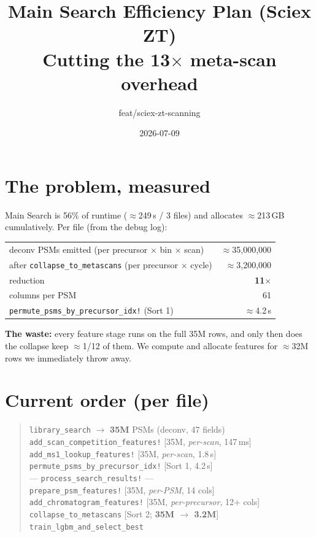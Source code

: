 \documentclass[11pt]{article}
\title{\textbf{Main Search Efficiency Plan (Sciex ZT)}\\[4pt]
\large Cutting the 13$\times$ meta-scan overhead}
\author{feat/sciex-zt-scanning}
\date{2026-07-09}
\newcommand{\code}[1]{\texttt{\small #1}}
\begin{document}
\maketitle

\section{The problem, measured}

Main Search is 56\% of runtime ($\approx$249\,s / 3 files) and allocates
$\approx$213\,GB cumulatively. Per file (from the debug log):

\begin{center}
\begin{tabular}{lr}
\toprule
deconv PSMs emitted (per precursor $\times$ bin $\times$ scan) & $\approx$35{,}000{,}000 \\
after \code{collapse\_to\_metascans} (per precursor $\times$ cycle) & $\approx$3{,}200{,}000 \\
reduction & \textbf{11$\times$} \\
columns per PSM & 61 \\
\code{permute\_psms\_by\_precursor\_idx!} (Sort 1) & $\approx$4.2\,s \\
\bottomrule
\end{tabular}
\end{center}

\textbf{The waste:} every feature stage runs on the full 35M rows, and only then
does the collapse keep $\approx$1/12 of them. We compute and allocate features for
$\approx$32M rows we immediately throw away.

\section{Current order (per file)}

\begin{quote}
\code{library\_search} $\to$ \textbf{35M} PSMs (deconv, 47 fields)\\
\code{add\_scan\_competition\_features!} \hfill [35M, \emph{per-scan}, 147\,ms]\\
\code{add\_ms1\_lookup\_features!} \hfill [35M, \emph{per-scan}, 1.8\,s]\\
\code{permute\_psms\_by\_precursor\_idx!} \hfill [Sort 1, 4.2\,s]\\
--- \code{process\_search\_results!} ---\\
\code{prepare\_psm\_features!} \hfill [35M, \emph{per-PSM}, 14 cols]\\
\code{add\_chromatogram\_features!} \hfill [35M, \emph{per-precursor}, 12+ cols]\\
\code{collapse\_to\_metascans} \hfill [Sort 2; \textbf{35M $\to$ 3.2M}]\\
\code{train\_lgbm\_and\_select\_best}
\end{quote}
\end{document}
